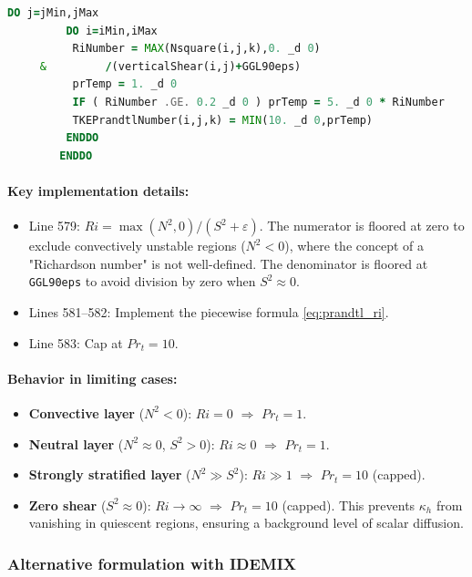 \documentclass[12pt,letterpaper]{article}
\begin{document}
\begin{lstlisting}[language=Fortran,caption={(ggl90\_calc.F:L577--585) TKE Prandtl number}]
        DO j=jMin,jMax
         DO i=iMin,iMax
          RiNumber = MAX(Nsquare(i,j,k),0. _d 0)
     &         /(verticalShear(i,j)+GGL90eps)
          prTemp = 1. _d 0
          IF ( RiNumber .GE. 0.2 _d 0 ) prTemp = 5. _d 0 * RiNumber
          TKEPrandtlNumber(i,j,k) = MIN(10. _d 0,prTemp)
         ENDDO
        ENDDO
\end{lstlisting}

\paragraph{Key implementation details:}
\begin{itemize}
\item Line 579: $Ri = \max(N^2, 0) / (S^2 + \varepsilon)$. The numerator is floored at zero to exclude convectively unstable regions ($N^2 < 0$), where the concept of a "Richardson number" is not well-defined. The denominator is floored at \verb|GGL90eps| to avoid division by zero when $S^2 \approx 0$.
\item Lines 581--582: Implement the piecewise formula \eqref{eq:prandtl_ri}.
\item Line 583: Cap at $Pr_t = 10$.
\end{itemize}

\paragraph{Behavior in limiting cases:}
\begin{itemize}
\item \textbf{Convective layer} ($N^2 < 0$): $Ri = 0$ $\Rightarrow$ $Pr_t = 1$.
\item \textbf{Neutral layer} ($N^2 \approx 0$, $S^2 > 0$): $Ri \approx 0$ $\Rightarrow$ $Pr_t = 1$.
\item \textbf{Strongly stratified layer} ($N^2 \gg S^2$): $Ri \gg 1$ $\Rightarrow$ $Pr_t = 10$ (capped).
\item \textbf{Zero shear} ($S^2 \approx 0$): $Ri \to \infty$ $\Rightarrow$ $Pr_t = 10$ (capped). This prevents $\kappa_h$ from vanishing in quiescent regions, ensuring a background level of scalar diffusion.
\end{itemize}

\subsubsection{Alternative formulation with IDEMIX}
\end{document}
